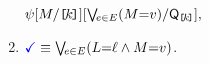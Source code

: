\begin{multicols}{2}
\begin{enumerate}[topsep=0pt,label=(\textsc{w}\arabic*),ref=\textsc{w}\arabic*]
{      \begin{math}
        \psi
        [M/\mkern-0mu\texttt{[}\mkern-2muk \mkern-2mu\texttt{]}\mkern-0mu]
        [\textstyle\bigvee{}\!\!{}_{e\in E}(M{=}v)/\mathsf{Q}_{\mkern-0mu\texttt{[}\mkern-2muk \mkern-2mu\texttt{]}\mkern-0mu}],
      \end{math}}
  \item \label{write-term-addr}
    $\aTerm \riff {\textstyle\bigvee{}\!\!{}_{\aEv\in\aEvs}\PBR{\cExp{=}\cVal \land \aExp{=}\aVal}}$.
  \end{enumerate}
\end{multicols}

